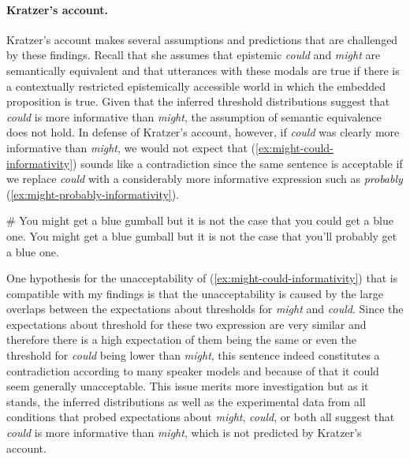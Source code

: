\paragraph{Kratzer's account.} Kratzer's account makes several assumptions and predictions that are challenged by these findings. Recall that she assumes that epistemic \textit{could} and
\textit{might} are semantically equivalent and that utterances with these modals are true if there is a contextually restricted epistemically accessible
world in which the embedded proposition is true. Given that the inferred threshold distributions suggest that \textit{could} is more informative than \textit{might},
the assumption of semantic equivalence does not hold. In defense of Kratzer's account, however, if \textit{could} was clearly more informative than \textit{might},
we would not expect that (\ref{ex:might-could-informativity}) sounds like a contradiction since the same sentence is acceptable if we replace \textit{could} with
a considerably more informative expression such as \textit{probably} (\ref{ex:might-probably-informativity}).


\begin{exe}
\ex \label{ex:might-could-informativity} \# You might get a blue gumball but it is not the case that you could get a blue one.
\ex \label{ex:might-probably-informativity} You might get a blue gumball but it is not the case that you'll probably get a blue one.
\end{exe}

\noindent One hypothesis for the unacceptability of (\ref{ex:might-could-informativity}) that is compatible with my findings is
that the unacceptability is caused by the large overlaps between the expectations about thresholds for \textit{might} and \textit{could}. 
Since the expectations about threshold for these two expression are very similar and therefore there is a 
high expectation of them being the same or even the threshold for \textit{could} being lower than \textit{might}, this sentence
indeed constitutes a contradiction according to many speaker models and  because of that it could seem generally unacceptable.
This issue merits more investigation but as it stands,  the inferred distributions as well as the experimental data from all conditions
that probed expectations about \textit{might}, \textit{could}, or both all suggest that \textit{could} is more informative than \textit{might}, which is not
predicted by Kratzer's account.

